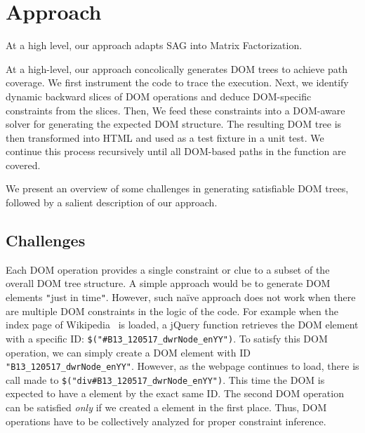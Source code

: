 \section{Approach}
At a high level, our approach adapts SAG into Matrix Factorization.


At a high-level, our approach concolically generates DOM trees to achieve path coverage. We first instrument the \js code to trace the execution. Next, we identify dynamic backward slices of DOM operations and deduce DOM-specific constraints from the slices. Then, We feed these constraints into a DOM-aware solver for generating the expected DOM structure. 
The resulting DOM tree is then transformed into HTML and used as a test fixture in a \js unit test. We continue this process recursively until all DOM-based paths in the \js function are covered.

We present an overview of some challenges in generating satisfiable DOM trees, followed by a salient description of our approach.

\subsection{Challenges}

Each DOM operation provides a single constraint or clue to a subset of the overall DOM tree structure. A simple approach would be to generate DOM elements {\tt "}just in time{\tt "}.  
However, such na\"ive approach does not work when there are multiple DOM constraints in the logic of the code. 
For example when the index page of Wikipedia~\cite{wikipedia} is loaded,  a jQuery function retrieves the DOM element with a specific ID: {\tt \$("\#B13\_120517\_dwrNode\_enYY")}.
To satisfy this DOM operation, we can simply create a DOM element with ID {\tt "B13\_120517\_dwrNode\_enYY"}.  
However, as the webpage continues to load, there is call made to {\tt \$("div\#B13\_120517\_dwrNode\_enYY")}.  
This time the DOM is expected to have a  element by the exact same ID.  
The second DOM operation can be satisfied {\em only} if we created a  element in the first place.  Thus, DOM operations have to be collectively analyzed for proper constraint inference.

